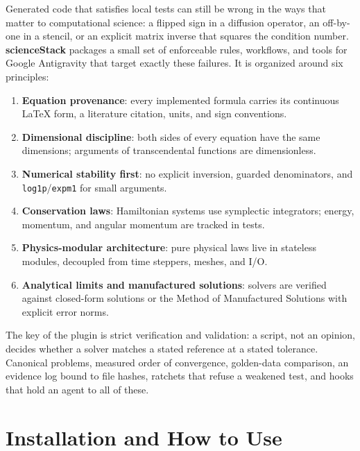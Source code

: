 \documentclass[11pt,a4paper]{report}
\begin{document}
Generated code that satisfies local tests can still be wrong in the ways that matter to computational science: a flipped sign in a diffusion operator, an off-by-one in a stencil, or an explicit matrix inverse that squares the condition number. \textbf{scienceStack} packages a small set of enforceable rules, workflows, and tools for Google Antigravity that target exactly these failures. It is organized around six principles:
\begin{enumerate}[itemsep=2pt]
    \item \textbf{Equation provenance}: every implemented formula carries its continuous LaTeX form, a literature citation, units, and sign conventions.
    \item \textbf{Dimensional discipline}: both sides of every equation have the same dimensions; arguments of transcendental functions are dimensionless.
    \item \textbf{Numerical stability first}: no explicit inversion, guarded denominators, and \texttt{log1p}/\texttt{expm1} for small arguments.
    \item \textbf{Conservation laws}: Hamiltonian systems use symplectic integrators; energy, momentum, and angular momentum are tracked in tests.
    \item \textbf{Physics-modular architecture}: pure physical laws live in stateless modules, decoupled from time steppers, meshes, and I/O.
    \item \textbf{Analytical limits and manufactured solutions}: solvers are verified against closed-form solutions or the Method of Manufactured Solutions with explicit error norms.
\end{enumerate}

The key of the plugin is strict verification and validation: a script, not an opinion, decides whether a solver matches a stated reference at a stated tolerance. Canonical problems, measured order of convergence, golden-data comparison, an evidence log bound to file hashes, ratchets that refuse a weakened test, and hooks that hold an agent to all of these.

\newpage
{}

\chapter{Installation and How to Use}
\end{document}
